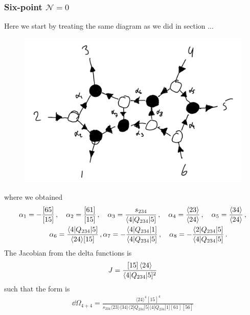 \documentclass[letter,11pt]{article}
\newcommand{\ab}[1]{\langle #1 \rangle}
\newcommand{\sqb}[1]{[ #1 ]}
\newcommand{\aMs}[3]{\langle #1|#2|#3]}  		%
\newcommand{\sab}[1]{s_{#1}}
\newcommand{\twhite}[1]{\textcolor{white}{#1}}
\begin{document}
\subsubsection{Six-point $\mathcal{N}=0$}
Here we start by treating the same diagram as we did in section ...
\begin{figure}[H]
	\centering
	\includegraphics[width=0.5\linewidth]{6ptYM}
	\caption{}
	\label{fig:5pt}
\end{figure}
where we obtained
\begin{align*}
	& \alpha_1 = -\frac{[65]}{[15]}\,, \quad \alpha_2 = \frac{[61]}{[15]}\,, \quad \alpha_3 = \frac{\sab{234}}{\aMs{4}{Q_{234}}{5}}\,, \quad \alpha_4 = \frac{\ab{23}}{\ab{24}}\,, \quad
	\alpha_5 = \frac{\ab{34}}{\ab{24}}\,, \\ 
	& \twhite{.}\hspace{1.4cm} 
	\alpha_6 = \frac{\aMs{4}{Q_{234}}{5}}{\ab{24}\sqb{15}}\,, \alpha_7 = -\frac{\aMs{4}{Q_{234}}{1}}{\aMs{4}{Q_{234}}{5}}\,,\quad
	\alpha_8 = - \frac{\aMs{2}{Q_{234}}{5}}{\aMs{4}{Q_{234}}{5}}\,.
\end{align*}
The Jacobian from the delta functions is
\begin{equation}
	\begin{aligned}
		J=\frac{[15]\expval{24}}{\aMs{4}{Q_{234}}{5}^2}
	\end{aligned}
\end{equation}
such that the form is
\begin{equation}
	\begin{aligned}
		\dd\Omega_{4+4}=\frac{\ab{24}^4 \sqb{15}^4}{s_{234}\ab{23}\ab{34}\aMs{2}{Q_{234}}{5}\aMs{4}{Q_{234}}{1}\sqb{61}\sqb{56}}
	\end{aligned}
\end{equation}
\end{document}
